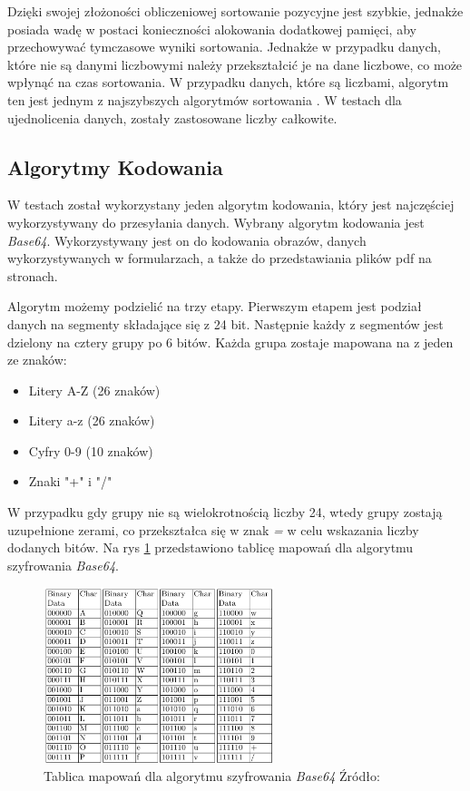 Dzięki swojej złożoności obliczeniowej sortowanie pozycyjne jest szybkie, jednakże posiada wadę w postaci konieczności alokowania dodatkowej pamięci, aby przechowywać tymczasowe wyniki sortowania. Jednakże w przypadku danych, które nie są danymi liczbowymi należy przekształcić je na dane liczbowe, co może wpłynąć na czas sortowania. W przypadku danych, które są liczbami, algorytm ten jest jednym z najszybszych algorytmów sortowania \cite{sorting}. W testach dla ujednolicenia danych, zostały zastosowane liczby całkowite.

\subsection{Algorytmy Kodowania}
W testach został wykorzystany jeden algorytm kodowania, który jest najczęściej wykorzystywany do przesyłania danych. Wybrany algorytm kodowania jest \textit{Base64}. Wykorzystywany jest on do kodowania obrazów, danych wykorzystywanych w formularzach, a także do przedstawiania plików pdf na stronach.

Algorytm możemy podzielić na trzy etapy. Pierwszym etapem jest podział danych na segmenty składające się z 24 bit. Następnie każdy z segmentów jest dzielony na cztery grupy po 6 bitów. Każda grupa zostaje mapowana na z jeden ze znaków:
\begin{itemize}
  \item Litery A-Z (26 znaków)
  \item Litery a-z (26 znaków)
  \item Cyfry 0-9 (10 znaków)
  \item Znaki "+" i "/"
\end{itemize}
W przypadku gdy grupy nie są wielokrotnością liczby 24, wtedy grupy zostają uzupełnione zerami, co przekształca się w znak \textit{=} w celu wskazania liczby dodanych bitów. Na rys \ref{fig:base64_mapping_table} przedstawiono tablicę mapowań dla algorytmu szyfrowania \textit{Base64}.

\begin{figure}[H]
  \centering
  \includegraphics[width=0.6\textwidth]{Figures/base64_mapping_table.png}
  \caption{Tablica mapowań dla algorytmu szyfrowania \textit{Base64} Źródło: \cite{cryptoeprint:2022/361}}
  \label{fig:base64_mapping_table}
\end{figure}

